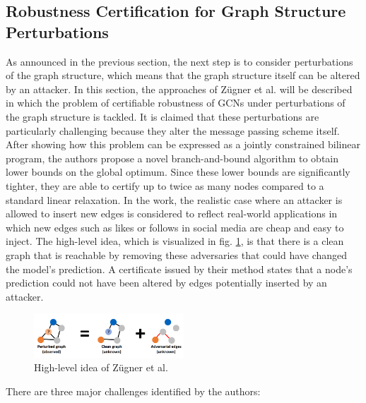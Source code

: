 \documentclass[a4paper,preprint]{sig-alternate}
\begin{document}
\subsection{Robustness Certification for Graph Structure Perturbations}
\label{sec:paper_three}

As announced in the previous section, the next step is to consider perturbations of the graph structure,
which means that the graph structure itself can be altered by an attacker.
In this section, the approaches of Zügner et al. \cite{10.1145/3394486.3403217} will be described in which the
problem of certifiable robustness of GCNs under perturbations of the graph structure is tackled. It is claimed that these perturbations 
are particularly challenging because they alter the message passing scheme itself.
After showing how this problem can be expressed as a jointly constrained bilinear program, the authors propose a novel branch-and-bound
algorithm to obtain lower bounds on the global optimum. Since these lower bounds are significantly tighter, they are able to
certify up to twice as many nodes compared to a standard linear relaxation.
In the work, the realistic case where an attacker is allowed to insert new edges is considered to reflect real-world
applications in which new edges such as likes or follows in social media are cheap and easy to inject. 
The high-level idea, which is visualized in fig. \ref{fig:high_level}, is that there is a clean graph that is reachable by removing
these adversaries that could have changed the model's prediction.
A certificate issued by their method states that a node's prediction could not have been altered by edges potentially
inserted by an attacker. 
\begin{figure}[h]
    \centering
    \includegraphics[width=0.5\textwidth]{img/high_level_graph_pert.png}
    \caption{High-level idea of Zügner et al. \cite{10.1145/3394486.3403217}}
    \label{fig:high_level}
\end{figure}

There are three major challenges identified by the authors:
\end{document}

